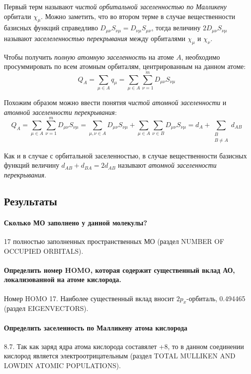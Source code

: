 Первый терм называют \textit{чистой орбитальной заселенностью по Малликену} орбитали $\chi_\mu$. Можно заметить, что во втором терме в случае вещественности базисных функций справедливо $D_{\mu\nu}S_{\nu\mu} = D_{\nu\mu}S_{\mu\nu}$, тогда величину
$2D_{\mu\nu}S_{\nu\mu}$ называют \textit{заселеленностью перекрывания} между орбиталями $\chi_\mu$ и $\chi_\nu$.

Чтобы получить \textit{полную атомную заселенность} на атоме $A$, необходимо просуммировать по всем атомным орбиталям, центрированным на данном атоме:
\begin{equation}
    Q_{A} = \sum\limits_{\mu\in A}q_{\mu} = \sum\limits_{\mu\in A}\sum\limits_{\nu=1}^{m}D_{\mu\nu}S_{\nu\mu}
\end{equation}

Похожим образом можно ввести понятия \textit{чистой атомной заселенности} и \textit{атомной заселенности перекрывания}:
\begin{equation}
    Q_{A} = \sum\limits_{\mu\in A}\sum\limits_{\nu=1}^{m}D_{\mu\nu}S_{\nu\mu} = \sum\limits_{\mu, \nu \in A}D_{\mu\nu}S_{\nu\mu} + \sum\limits_{\mu\in A}\sum\limits_{\nu\in B}D_{\mu\nu}S_{\nu\mu} = d_{A} + \sum\limits_{\substack{B \\ B \neq A}}d_{AB}
\end{equation}

Как и в случае с орбитальной заселенностью, в случае вещественности базисных функций величину $d_{AB} + d_{BA} = 2d_{AB}$ называют \textit{атомной заселенности перекрывания}.


\subsection{Результаты}
\paragraph*{Сколько МО заполнено у данной молекулы?}
17 полностью заполненных пространственных МО (раздел NUMBER OF OCCUPIED ORBITALS).

\paragraph*{Определить номер HOMO, которая содержит существенный вклад АО, локализованной на атоме кислорода.}
Номер HOMO 17. Наиболее существенный вклад вносит $2p_x$-орбиталь, 0.494465 (раздел EIGENVECTORS).

\paragraph*{Определить заселенность по Малликену атома кислорода}
8.7. Так как заряд ядра атома кислорода составялет +8, то в данном соединении кислород является электроотрицательным (раздел TOTAL MULLIKEN AND LOWDIN ATOMIC POPULATIONS).


